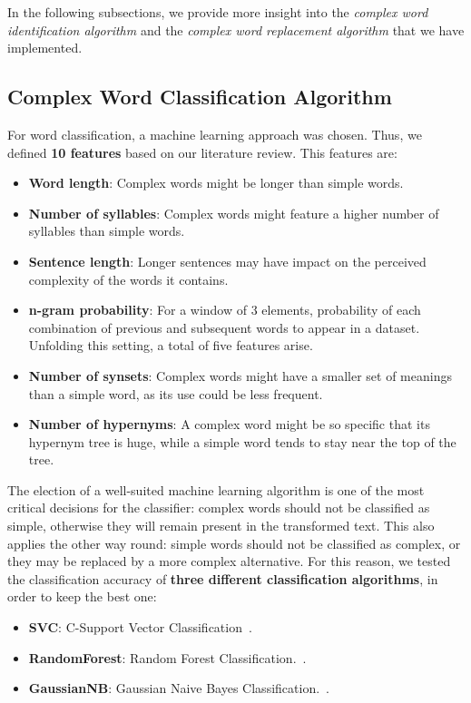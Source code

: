 \documentclass[11pt,a4paper]{article}
\begin{document}
In the following subsections, we provide more insight into the \emph{complex word identification algorithm} and the \emph{complex word replacement algorithm} that we have implemented.

\subsection{Complex Word Classification Algorithm}
\label{ssec:cwia}

For word classification, a machine learning approach was chosen. Thus, we defined \textbf{10 features} based on our literature review. This features are:

\begin{itemize}
	\item{\textbf{Word length}: Complex words might be longer than simple words.}
	\item{\textbf{Number of syllables}: Complex words might feature a higher number of syllables than simple words.}
	\item{\textbf{Sentence length}: Longer sentences may have impact on the perceived complexity of the words it contains.}
	\item{\textbf{n-gram probability}: For a window of 3 elements, probability of each combination of previous and subsequent words to appear in a dataset. Unfolding this setting, a total of five features arise.}
	\item{\textbf{Number of synsets}: Complex words might have a smaller set of meanings than a simple word, as its use could be less frequent.}
	\item{\textbf{Number of hypernyms}: A complex word might be so specific that its hypernym tree is huge, while a simple word tends to stay near the top of the tree.}
\end{itemize}

The election of a well-suited machine learning algorithm is one of the most critical decisions for the classifier: complex words should not be classified as simple, otherwise they will remain present in the transformed text. This also applies the other way round: simple words should not be classified as complex, or they may be replaced by a more complex alternative. For this reason, we tested the classification accuracy of \textbf{three different classification algorithms}, in order to keep the best one:

\begin{itemize}
	\item{\textbf{SVC}: C-Support Vector Classification~\cite{chang2011libsvm}.}
	\item{\textbf{RandomForest}: Random Forest Classification.~\cite{ho1998random}.}
	\item{\textbf{GaussianNB}: Gaussian Naive Bayes Classification.~\cite{hand2001idiot}.}
\end{itemize}
\end{document}
